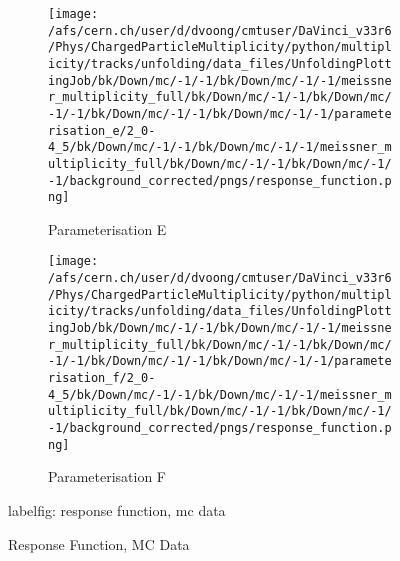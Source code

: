 \begin{figure}[h]
\begin{subfigure}{0.49\textwidth}
	\end{subfigure}
	\begin{subfigure}{0.49\textwidth}
		\texttt{[image: /afs/cern.ch/user/d/dvoong/cmtuser/DaVinci\_v33r6/Phys/ChargedParticleMultiplicity/python/multiplicity/tracks/unfolding/data\_files/UnfoldingPlottingJob/bk/Down/mc/-1/-1/bk/Down/mc/-1/-1/meissner\_multiplicity\_full/bk/Down/mc/-1/-1/bk/Down/mc/-1/-1/bk/Down/mc/-1/-1/bk/Down/mc/-1/-1/parameterisation\_e/2\_0-4\_5/bk/Down/mc/-1/-1/bk/Down/mc/-1/-1/meissner\_multiplicity\_full/bk/Down/mc/-1/-1/bk/Down/mc/-1/-1/background\_corrected/pngs/response\_function.png]}
		\caption{Parameterisation E}
	\end{subfigure}
	\begin{subfigure}{0.49\textwidth}
		\texttt{[image: /afs/cern.ch/user/d/dvoong/cmtuser/DaVinci\_v33r6/Phys/ChargedParticleMultiplicity/python/multiplicity/tracks/unfolding/data\_files/UnfoldingPlottingJob/bk/Down/mc/-1/-1/bk/Down/mc/-1/-1/meissner\_multiplicity\_full/bk/Down/mc/-1/-1/bk/Down/mc/-1/-1/bk/Down/mc/-1/-1/bk/Down/mc/-1/-1/parameterisation\_f/2\_0-4\_5/bk/Down/mc/-1/-1/bk/Down/mc/-1/-1/meissner\_multiplicity\_full/bk/Down/mc/-1/-1/bk/Down/mc/-1/-1/background\_corrected/pngs/response\_function.png]}
		\caption{Parameterisation F}
	\end{subfigure}
	\caption{Response Function, MC Data}
	label{fig: response function, mc data}
\end{figure}

